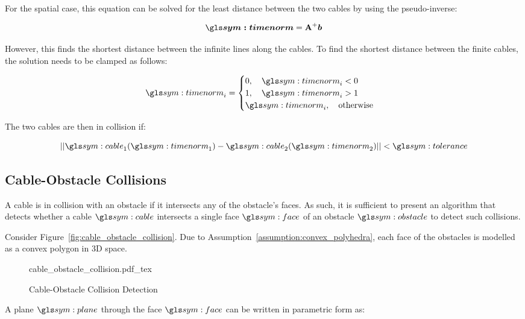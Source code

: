 		For the spatial case, this equation can be solved for the least distance
		between the two cables by using the pseudo-inverse:

		\begin{equation}
			\vec{\timenorm} = \pseudoinv{\mat{A}}\vec{b}
		\end{equation}

		However, this finds the shortest distance between the infinite lines
		along the cables. To find the shortest distance between the finite
		cables, the solution needs to be clamped as follows:

		\begin{equation}
			\timenorm_i =
			\begin{cases}
				0, \quad \timenorm_i < 0 \\
				1, \quad \timenorm_i > 1 \\
				\timenorm_i, \quad \text{otherwise}
			\end{cases}
		\end{equation}

		The two cables are then in collision if:

		\begin{equation}
			\norm{\cable_1(\timenorm_1) - \cable_2(\timenorm_2)} < \tol
		\end{equation}

	\subsection{Cable-Obstacle Collisions}

		A cable is in collision with an obstacle if it intersects any of the
		obstacle's faces. As such, it is sufficient to present an algorithm that
		detects whether a cable $\cable$ intersects a single face $\face$ of an
		obstacle $\obstacle$ to detect such collisions.

		Consider Figure~\ref{fig:cable_obstacle_collision}. Due to
		Assumption~\ref{assumption:convex_polyhedra}, each face of the obstacles
		is modelled as a convex polygon in 3D space.

		\begin{figure}[hbt]
			\centering
			\def\svgwidth{\columnwidth}
			{cable_obstacle_collision.pdf_tex}
			\caption{Cable-Obstacle Collision Detection}%
			\label{fig:cable_obstacle_collision_detection}
		\end{figure}

		A plane $\plane$ through the face $\face$ can be written in parametric
		form as:

